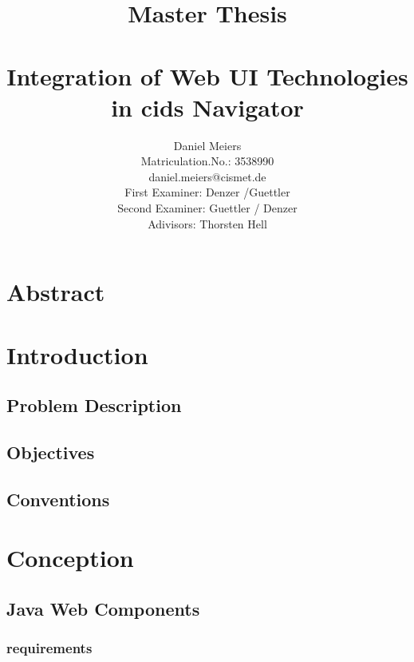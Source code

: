 

\title{%
\large Master Thesis\\
\\[20mm]
{\LARGE Integration of Web UI Technologies in cids Navigator}\\[30mm]
}


\author{%
Daniel Meiers\\
Matriculation.No.: 3538990\\
daniel.meiers@cismet.de\\[15mm]
First Examiner: Denzer /Guettler\\
Second Examiner: Guettler / Denzer\\
Adivisors: Thorsten Hell\\[20mm]
}





\maketitle
 
\tableofcontents



\chapter{Abstract}
\chapter{Introduction}
	\section{Problem Description}
	\section{Objectives}
	\section{Conventions}

\chapter{Conception}
	\section{Java Web Components}
		\subsection{requirements}
